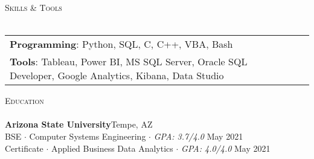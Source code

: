 \documentclass[a4paper]{article}
\newcommand{\lineunder} {
    \vspace*{-8pt} \\
    \hspace*{-18pt} \hrulefill \\
}
\newcommand{\header} [1] {
    {\hspace*{-18pt}\vspace*{6pt} \textsc{#1}}
    \vspace*{-6pt} \lineunder
}
\begin{document}
\header{\large{Skills \& Tools}}
\vspace{1mm}
\begin{tabular}{ l l }
	\textbf{Programming}:  Python, SQL, C, C++, VBA, Bash \\
	\textbf{Tools}: Tableau, Power BI, MS SQL Server, Oracle SQL Developer, Google Analytics, Kibana, Data Studio\\
\end{tabular}
\vspace{-1mm}

\header{\large{Education}}
\textbf{Arizona State University}\hfill Tempe, AZ\\
BSE $\cdot$ Computer Systems Engineering $\cdot$ \textit{GPA: 3.7/4.0} \hfill May 2021\\
Certificate $\cdot$ Applied Business Data Analytics $\cdot$ \textit{GPA: 4.0/4.0} \hfill May 2021\\
\vspace{2mm}

\ 
\end{document}
